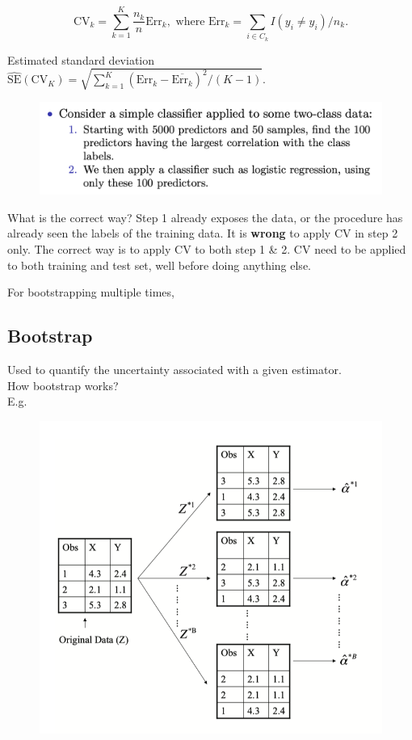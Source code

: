 \documentclass{article}
\begin{document}
$$\mathrm{CV}_k = \sum_{k=1}^K \frac{n_k}{n} \mathrm{Err}_k, \text{ where } \mathrm{Err}_k = \sum_{i \in C_k} I(y_i \neq \hat{y}_i)/n_k. $$

Estimated standard deviation $\displaystyle \mathrm{\widehat{SE}}(\mathrm{CV}_K) = \sqrt{\sum_{k=1}^K (\mathrm{Err}_k - \overline{\mathrm{Err}_k})^2/(K-1)}.$

\begin{figure}[h!]
    \centering
    \includegraphics[width=0.90\linewidth]{exmaple_case.png}
\end{figure}

What is the correct way? Step 1 already exposes the data, or the procedure has already seen the labels of the training data. It is \textbf{wrong} to apply CV in step 2 only. The correct way is to apply CV to both step 1 \& 2. CV need to be applied to both training and test set, well before doing anything else.

For bootstrapping multiple times, 

\subsection{Bootstrap}

Used to quantify the uncertainty associated with a given estimator.\\

How bootstrap works?\\

E.g. 

\begin{figure}[h!]
    \centering
    \includegraphics[width=0.5\linewidth]{bootstrap.png}
\end{figure}
\end{document}
